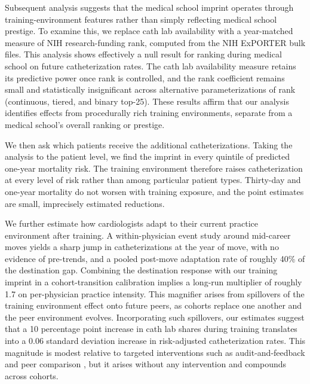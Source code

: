 \documentclass[12pt]{article}
\begin{document}
Subsequent analysis suggests that the medical school imprint operates through training-environment features rather than simply reflecting medical school prestige. To examine this, we replace cath lab availability with a year-matched measure of NIH research-funding rank, computed from the NIH ExPORTER bulk files. This analysis shows effectively a null result for ranking during medical school on future catheterization rates. The cath lab availability measure retains its predictive power once rank is controlled, and the rank coefficient remains small and statistically insignificant across alternative parameterizations of rank (continuous, tiered, and binary top-25). These results affirm that our analysis identifies effects from procedurally rich training environments, separate from a medical school's overall ranking or prestige.

We then ask which patients receive the additional catheterizations. Taking the analysis to the patient level, we find the imprint in every quintile of predicted one-year mortality risk. The training environment therefore raises catheterization at every level of risk rather than among particular patient types. Thirty-day and one-year mortality do not worsen with training exposure, and the point estimates are small, imprecisely estimated reductions.

We further estimate how cardiologists adapt to their current practice environment after training. A within-physician event study around mid-career moves yields a sharp jump in catheterizations at the year of move, with no evidence of pre-trends, and a pooled post-move adaptation rate of roughly 40\% of the destination gap. Combining the destination response with our training imprint in a cohort-transition calibration implies a long-run multiplier of roughly 1.7 on per-physician practice intensity. This magnifier arises from spillovers of the training environment effect onto future peers, as cohorts replace one another and the peer environment evolves. Incorporating such spillovers, our estimates suggest that a 10 percentage point increase in cath lab shares during training translates into a 0.06 standard deviation increase in risk-adjusted catheterization rates. This magnitude is modest relative to targeted interventions such as audit-and-feedback and peer comparison \citep{ivers2012, doctor2018, barnett2023}, but it arises without any intervention and compounds across cohorts.
\end{document}
